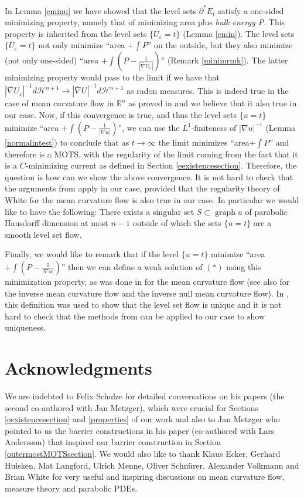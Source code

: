 \documentclass[11pt]{amsart}
\renewcommand{\epsilon}{\varepsilon}
\DeclareMathOperator{\graph}{graph} \DeclareMathOperator{\closure}{Closure}
\def\R{\mathbb{R}}
\def\e{\epsilon}
\def\H{\mathcal{H}}
\def\ov{\overline}
\begin{document}
In Lemma \ref{eminu} we have showed that the level sets $\partial^*E_t$ satisfy a one-sided minimizing property, namely that of minimizing area plus {\it bulk energy P}. This property is inherited  from the level sets $\{U_\e=t\}$  (Lemma \ref{emin}). The level sets  $\{U_\e=t\}$ not only minimize ``area $+\int P$'' on the outside, but they also minimize (not only one-sided)  ``area $+\int \left(P-\frac{1}{|\ov\nabla U_\e|}\right)$'' (Remark \ref{minimrmk}).  The latter minimizing property would pass to the limit  if we have that $|\ov\nabla U_\e|^{-1}d\H^{n+1}\to|\ov\nabla U|^{-1}d\H^{n+1}$ as radon measures. This is indeed true in the case of mean curvature flow in $\R^n$ as proved in \cite{MS} and we believe that it also true in our case.  Now, if this convergence is true, and thus the level sets $\{u=t\}$ minimize ``area $+\int \left(P-\frac{1}{|\nabla u|}\right)$'', we can use the $L^1$-finiteness of $|\nabla u|^{-1}$ (Lemma \ref{normalintest}) to conclude that as $t\to \infty$ the limit minimizes ``area$+\int P$'' and therefore is a MOTS, with the regularity of the limit coming from the fact that it is a $C$-minimizing current as defined in Section \ref{eexistencesection}.  
Therefore, the question is how can we show the above convergence. It is not hard to check that the arguments from  \cite{MS} apply in our case, provided that the regularity theory of White \cite{W00} for the mean curvature flow is also true in our case. In particular we would like to have the following: There exists a singular set $S\subset \graph u$ of parabolic Hausdorff  dimension at most $n-1$ outside of which the sets $\{u=t\}$ are a smooth level set flow.

Finally, we would like to remark that if the level $\{u=t\}$ minimize ``area $+\int \left(P-\frac{1}{|\nabla u|}\right)$'' then we can define a weak solution of $(*)$ using this minimization property, as was done in \cite{MS} for the mean curvature flow (see also \cite{HI01, KM13} for the inverse mean curvature flow and the inverse null mean curvature flow). In \cite{MS}, this definition was used to show that the level set flow is unique and it is not hard to check that the methods from \cite{MS} can be applied to our case to show uniqueness. 



\section*{Acknowledgments}
 We are  indebted to Felix Schulze for detailed conversations on his papers \cite{S08, MS} (the second co-authored with Jan Metzger), which were crucial for Sections \ref{eexistencesection} and \ref{properties} of our work and also to Jan Metzger who pointed to us the barrier constructions in his paper \cite{AM09} (co-authored with Lars Andersson) that inspired our barrier construction in Section \ref{outermostMOTSsection}. We would also like to thank Klaus Ecker, Gerhard Huisken,  Mat Langford, Ulrich Menne, Oliver Schn\"urer, Alexander Volkmann and Brian White for very useful and inspiring discussions on mean curvature flow, measure theory and parabolic PDEs.
\vspace{0in}


\end{document}
